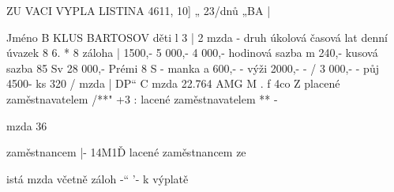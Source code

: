 \newpage
ZU VACI VYPLA LISTINA
4611, 10] „
23/dnů „BA |

Jméno B KLUS BARTOSOV
děti l 3 | 2
mzda - druh úkolová časová lat
denní úvazek 8 6. * 8
záloha | 1500,- 5 000,- 4 000,-
hodinová sazba m 240,-
kusová sazba 85
Sv 28 000,-
Prémi 8%
S - manka a 600,-
- výži 2000,-
- / 3 000,-
- půj 4500-
ks 320 /
mzda | DP“ C
mzda 22.764 AMG M . f 4co
Z placené zaměstnavatelem /**" +3 :
lacené zaměstnavatelem ** -

mzda 36

zaměstnancem |- 14M1Ď
lacené zaměstnancem
ze

istá mzda
včetně záloh -“ '-
k výplatě


\newpage